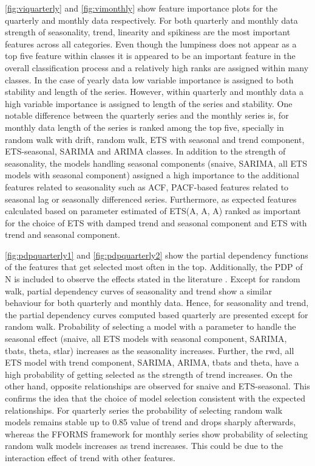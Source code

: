\documentclass[11pt,a4paper,]{article}
\begin{document}
\autoref{fig:viquarterly} and \autoref{fig:vimonthly} show feature
importance plots for the quarterly and monthly data respectively. For
both quarterly and monthly data strength of seasonality, trend,
linearity and spikiness are the most important features across all
categories. Even though the lumpiness does not appear as a top five
feature within classes it is appeared to be an important feature in the
overall classification process and a relatively high ranks are assigned
within many classes. In the case of yearly data low variable importance
is assigned to both stability and length of the series. However, within
quarterly and monthly data a high variable importance is assigned to
length of the series and stability. One notable difference between the
quarterly series and the monthly series is, for monthly data length of
the series is ranked among the top five, specially in random walk with
drift, random walk, ETS with seasonal and trend component, ETS-seasonal,
SARIMA and ARIMA classes. In addition to the strength of seasonality,
the models handling seasonal components (snaive, SARIMA, all ETS models
with seasonal component) assigned a high importance to the additional
features related to seasonality such as ACF, PACF-based features related
to seasonal lag or seasonally differenced series. Furthermore, as
expected features calculated based on parameter estimated of ETS(A, A,
A) ranked as important for the choice of ETS with damped trend and
seasonal component and ETS with trend and seasonal component.

\autoref{fig:pdpquarterly1} and \autoref{fig:pdpquarterly2} show the
partial dependency functions of the features that get selected most
often in the top. Additionally, the PDP of N is included to observe the
effects stated in the literature \autocite{makridakis2000m3}. Except for
random walk, partial dependency curves of seasonality and trend show a
similar behaviour for both quarterly and monthly data. Hence, for
seasonality and trend, the partial dependency curves computed based
quarterly are presented except for random walk. Probability of selecting
a model with a parameter to handle the seasonal effect (snaive, all ETS
models with seasonal component, SARIMA, tbats, theta, stlar) increases
as the seasonality increases. Further, the rwd, all ETS model with trend
component, SARIMA, ARIMA, tbats and theta, have a high probability of
getting selected as the strength of trend increases. On the other hand,
opposite relationships are observed for snaive and ETS-seasonal. This
confirms the idea that the choice of model selection consistent with the
expected relationships. For quarterly series the probability of
selecting random walk models remains stable up to 0.85 value of trend
and drops sharply afterwards, whereas the FFORMS framework for monthly
series show probability of selecting random walk models increases as
trend increases. This could be due to the interaction effect of trend
with other features.
\end{document}

